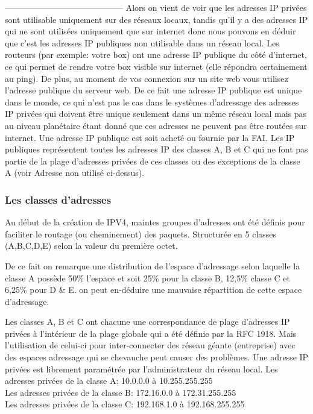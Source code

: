 ------------------------------------------
Alors on vient de voir que les adresses IP privées sont utilisable uniquement
sur des réseaux locaux, tandis qu’il y a des adresses IP qui ne sont utilisées
uniquement que sur internet donc nous pouvons en déduir que c’est les adresses
IP publiques non utilisable dans un réseau local. Les routeurs (par exemple:
votre box) ont une adresse IP publique du côté d’internet, ce qui permet de
rendre votre box visible sur internet (elle répondra certainement au ping). De
plus, au moment de vos connexion sur un site web vous utilisez l’adresse
publique du serveur web. De ce fait une adresse IP publique est unique dans le
monde, ce qui n’est pas le cas dans le systèmes d’adressage des adresses IP
privées qui doivent être unique seulement dans un même réseau local mais pas au
niveau planétaire étant donné que ces adresses ne peuvent pas être routées sur
internet. Une adresse IP publique est soit acheté ou fournie par la FAI.  Les
IP publiques représentent toutes les adresses IP des classes A, B et C qui ne
font pas partie de la plage d’adresses privées de ces classes ou des exceptions
de la classe A (voir Adresse non utilisé ci-dessus).


\subsubsection{Les classes d’adresses}
Au début de la création de IPV4, maintes groupes d’adresses ont été définis
pour faciliter le routage (ou cheminement) des paquets. Structurée en 5 classes
(A,B,C,D,E) selon la valeur du première octet.


De ce fait on remarque une distribution de l’espace d’adressage selon laquelle
la classe A possède 50\% l’espace et soit 25\% pour la classe B, 12,5\% classe
C et 6,25\% pour D \& E. on peut en-déduire une mauvaise répartition de cette
espace d’adressage. 

Les classes A, B et C ont chacune une correspondance de plage
d’adresses IP privées à l’intérieur de la plage globale qui a été définie par
la RFC 1918. Mais l’utilisation  de celui-ci pour inter-connecter des réseau
géante (entreprise) avec des espaces adressage qui se chevauche peut causer des
problèmes. Une adresse IP privées est librement paramétrée par l’administrateur
du réseau local.
Les adresses privées de la classe A: 10.0.0.0 à 10.255.255.255\\
Les adresses privées de la classe B: 172.16.0.0 à 172.31.255.255\\
Les adresses privées de la classe C: 192.168.1.0 à 192.168.255.255\\


